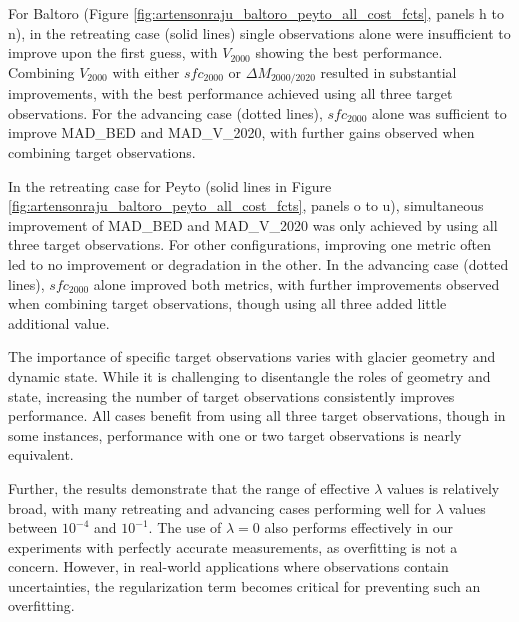 \documentclass[journal abbreviation, manuscript]{copernicus}
\begin{document}
For Baltoro (Figure \ref{fig:artensonraju_baltoro_peyto_all_cost_fcts}, panels h to n), in the retreating case (solid lines) single observations alone were insufficient to improve upon the first guess, with $V_{2000}$ showing the best performance. Combining $V_{2000}$ with either $sfc_{2000}$ or $\Delta M_{2000/2020}$ resulted in substantial improvements, with the best performance achieved using all three target observations. For the advancing case (dotted lines), $sfc_{2000}$ alone was sufficient to improve MAD\_BED and MAD\_V\_2020, with further gains observed when combining target observations.

In the retreating case for Peyto (solid lines in Figure \ref{fig:artensonraju_baltoro_peyto_all_cost_fcts}, panels o to u), simultaneous improvement of MAD\_BED and MAD\_V\_2020 was only achieved by using all three target observations. For other configurations, improving one metric often led to no improvement or degradation in the other. In the advancing case (dotted lines), $sfc_{2000}$ alone improved both metrics, with further improvements observed when combining target observations, though using all three added little additional value.

The importance of specific target observations varies with glacier geometry and dynamic state. While it is challenging to disentangle the roles of geometry and state, increasing the number of target observations consistently improves performance. All cases benefit from using all three target observations, though in some instances, performance with one or two target observations is nearly equivalent.

Further, the results demonstrate that the range of effective $\lambda$ values is relatively broad, with many retreating and advancing cases performing well for $\lambda$ values between $10^{-4}$ and $10^{-1}$. The use of $\lambda = 0$ also performs effectively in our experiments with perfectly accurate measurements, as overfitting is not a concern. However, in real-world applications where observations contain uncertainties, the regularization term becomes critical for preventing such an overfitting.
\end{document}
